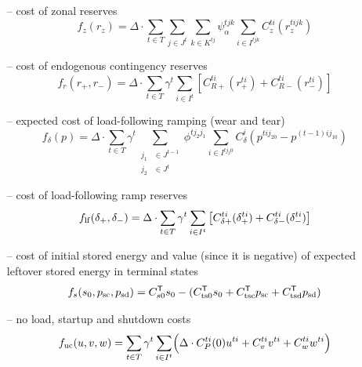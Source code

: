 \documentclass[12pt]{article}
\newcommand{\trans}[1]{#1^{\ensuremath{\mathsf{T}}}}    %
\numberwithin{equation}{section}
\numberwithin{table}{section}
\numberwithin{figure}{section}
\begin{document}
\begin{itemize}
\item[--] cost of zonal reserves\footnotemark[\value{footnote}]
\begin{equation}
f_z(r_z) = \Delta \cdot \sum_{t\in T} \sum_{j\in J^t} \sum_{k\in K^{tj}} \psi_\alpha^{tjk} \sum_{i\in I^{tjk}} C_z^{ti}(r_z^{tijk})
\label{eq:most_zres_cost}
\end{equation}
\item[--] cost of endogenous contingency reserves\footnotemark[\value{footnote}]
\begin{equation}
f_r(r_+, r_-) = \Delta \cdot \sum_{t\in T}  \gamma^t  \sum_{i\in I^t} \left[C_{R+}^{ti}(r_+^{ti}) + C_{R-}^{ti}(r_-^{ti}) \right]
\label{eq:most_cres_cost}
\end{equation}
\item[--] expected cost of load-following ramping (wear and tear)
\begin{equation}
f_\delta(p) = \Delta \cdot \sum_{t\in T} \! \gamma^t \!\!\!\!\! \sum_{\begin{aligned}\scriptstyle j_1 &\scriptstyle \in J^{t-1}\\[-6pt] \scriptstyle j_2 &\scriptstyle \in J^t\end{aligned}} \!\!\!\!\!
        \phi^{t j_2 j_1} \!\!\!\! \sum_{i\in I^{tj_2 0}} \!\!\! C_\delta^i(p^{tij_20} - p^{(t-1)ij_10})
\label{eq:rampcost}
\end{equation}
\item[--] cost of load-following ramp reserves
\begin{equation}
f_{\rm lf}(\delta_+, \delta_-) = \Delta \cdot \sum_{t\in T}  \gamma^t  \sum_{i\in I^t} \left[C_{\delta+}^{ti}(\delta_+^{ti}) + C_{\delta-}^{ti}(\delta_-^{ti}) \right]
\label{eq:most_rampres_cost}
\end{equation}
\item[--] cost of initial stored energy and value (since it is negative) of expected leftover stored energy in terminal states
\begin{equation}
f_s(s_0, p_{\rm sc}, p_{\rm sd}) = \trans{C_{s0}} s_0 - (\trans{C_{\rm ts0}} s_0 + \trans{C_{\rm tsc}} p_{\rm sc} + \trans{C_{\rm tsd}} p_{\rm sd}) \label{eq:storagecost}
\end{equation}
\item[--] no load, startup and shutdown costs
\begin{equation}
f_{\rm uc}(u,v,w) = \sum_{t\in T} \gamma^t \sum_{i\in I^t} \Bigl( \Delta \cdot C_P^{ti}(0) u^{ti} + C_v^{ti} v^{ti} +  C_w^{ti} w^{ti} \Bigr)
\end{equation}
\end{itemize}
\end{document}
